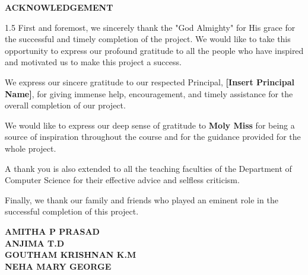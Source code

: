\documentclass[12pt, a4paper, oneside]{report}
\begin{document}
\begin{center}
    {\Large \textbf{ACKNOWLEDGEMENT} \par}
\end{center}
\vspace{1cm}
\begin{spacing}{1.5}
First and foremost, we sincerely thank the "God Almighty" for His grace for the successful and timely completion of the project. We would like to take this opportunity to express our profound gratitude to all the people who have inspired and motivated us to make this project a success.

We express our sincere gratitude to our respected Principal, \textbf{[Insert Principal Name]}, for giving immense help, encouragement, and timely assistance for the overall completion of our project.

We would like to express our deep sense of gratitude to \textbf{Moly Miss} for being a source of inspiration throughout the course and for the guidance provided for the whole project.

A thank you is also extended to all the teaching faculties of the Department of Computer Science for their effective advice and selfless criticism. 

Finally, we thank our family and friends who played an eminent role in the successful completion of this project.
\end{spacing}
\vspace{1cm}
\begin{flushright}
    \textbf{AMITHA P PRASAD} \\
    \textbf{ANJIMA T.D} \\
    \textbf{GOUTHAM KRISHNAN K.M} \\
    \textbf{NEHA MARY GEORGE}
\end{flushright}
\newpage
\end{document}
